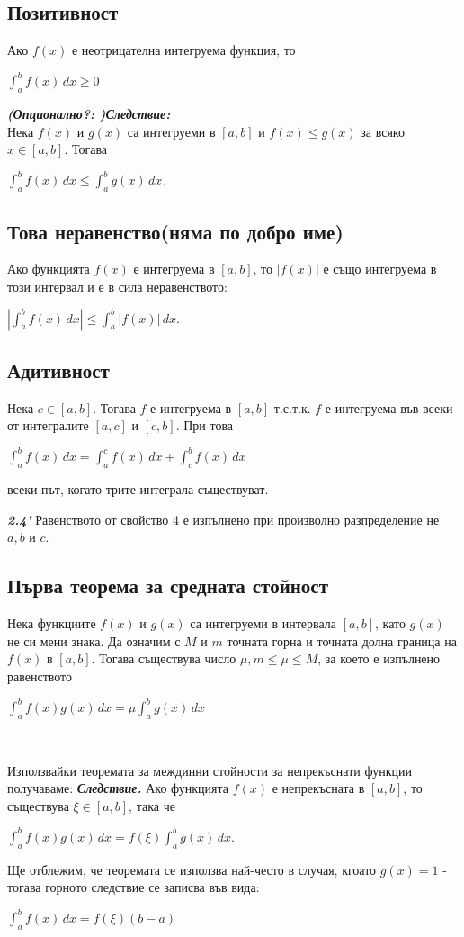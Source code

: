\documentclass[11pt]{article} %
\newcommand{\italicBold}[1]{\textbf{\emph{#1}}}
\newcommand{\integral}[4]{\displaystyle \int_{#1}^{#2}#3\,#4}
\begin{document}
\subsection{Позитивност}
Ако $f(x)$ е неотрицателна интегруема функция, то \\
\centerline{$\integral{a}{b}{f(x)}{dx} \geq 0$}

\italicBold{(Опционално?: )Следствие: }\\
Нека $f(x)$ и $g(x)$ са интегруеми в $[a,b]$ и $f(x)\leq g(x)$
за всяко $x \in [a,b]$. Тогава\\
\centerline{$\integral{a}{b}{f(x)}{dx} \leq \integral{a}{b}{g(x)}{dx}$.}

\subsection{Това неравенство(няма по добро име)}
Ако функцията $f(x)$ е интегруема в $[a,b]$, то $|f(x)|$ е също интегруема в този интервал и е в сила неравенството: \\
\centerline{$|\integral{a}{b}{f(x)}{dx}| \leq \integral{a}{b}{|f(x)|}{dx}$.}

\subsection{Адитивност}
Нека $c \in [a,b]$. Тогава $f$ е интегруема в $[a,b]$ т.с.т.к. $f$ е интегруема във всеки от интегралите $[a,c]$ и $[c,b]$. При това\\
\centerline{$\integral{a}{b}{f(x)}{dx}=\integral{a}{c}{f(x)}{dx} + \integral{c}{b}{f(x)}{dx}$}
всеки път, когато трите интеграла съществуват.

\italicBold{2.4'} Равенството от свойство 4 е изпълнено при произволно разпределение не $a, b$ и $c$.

\subsection{Първа теорема за средната стойност}
Нека функциите $f(x)$ и $g(x)$ са интегруеми в интервала $[a,b]$, като $g(x)$ не си мени знака. Да означим с $M$ и $m$ точната горна и точната долна граница на $f(x)$ в $[a,b]$. Тогава съществува число $\mu, m \leq \mu \leq M$, за което е изпълнено равенството\\
\centerline{$\integral{a}{b}{f(x)g(x)}{dx} = \mu \integral{a}{b}{g(x)}{dx}$}\\\par

Използвайки теоремата за междинни стойности за непрекъснати функции получаваме:
\italicBold{Следствие. }Ако функцията $f(x)$ е непрекъсната в $[a,b]$, то съществува $\xi \in [a,b]$, така че\\
\centerline{$\integral{a}{b}{f(x)g(x)}{dx} = f(\xi)\integral{a}{b}{g(x)}{dx}$.}
Ще отблежим, че теоремата се използва най-често в случая, кгоато $g(x) = 1$ - тогава горното следствие се записва във вида:\\
\centerline{$\integral{a}{b}{f(x)}{dx}=f(\xi)(b-a)$}
\end{document}

